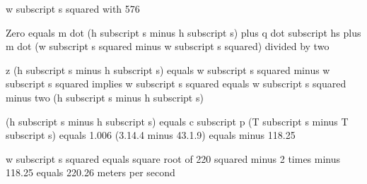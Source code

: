 w subscript s squared with 576

Zero equals m dot (h subscript s minus h subscript s) plus q dot subscript hs plus m dot (w subscript s squared minus w subscript s squared) divided by two

z (h subscript s minus h subscript s) equals w subscript s squared minus w subscript s squared implies w subscript s squared equals w subscript s squared minus two (h subscript s minus h subscript s)

(h subscript s minus h subscript s) equals c subscript p (T subscript s minus T subscript s) equals 1.006 (3.14.4 minus 43.1.9) equals minus 118.25

w subscript s squared equals square root of 220 squared minus 2 times minus 118.25 equals 220.26 meters per second